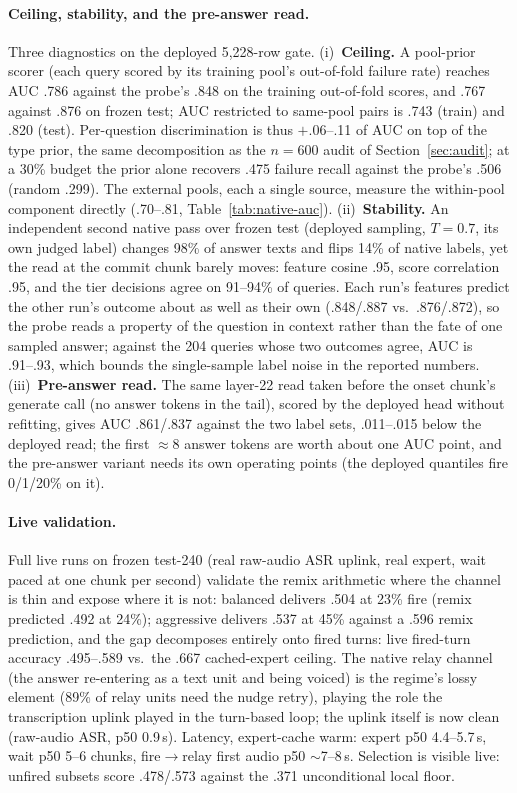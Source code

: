\paragraph{Ceiling, stability, and the pre-answer read.} Three
diagnostics on the deployed 5{,}228-row gate. (i)~\textbf{Ceiling.} A
pool-prior scorer (each query scored by its training pool's
out-of-fold failure rate) reaches AUC .786 against the probe's .848 on
the training out-of-fold scores, and .767 against .876 on frozen
test; AUC restricted to same-pool pairs is .743 (train) and .820
(test). Per-question discrimination is thus $+$.06--.11 of AUC on
top of the type prior, the same decomposition as the $n{=}600$ audit
of Section~\ref{sec:audit}; at a 30\% budget the prior alone recovers
.475 failure recall against the probe's .506 (random .299). The
external pools, each a single source, measure the within-pool
component directly (.70--.81, Table~\ref{tab:native-auc}).
(ii)~\textbf{Stability.} An independent second native pass over frozen
test (deployed sampling, $T{=}0.7$, its own judged label) changes 98\%
of answer texts and flips 14\% of native labels, yet the read at the
commit chunk barely moves: feature cosine .95, score correlation .95,
and the tier decisions agree on 91--94\% of queries. Each run's
features predict the other run's outcome about as well as
their own (.848/.887 vs.\ .876/.872), so the probe reads a property
of the question in context rather than the fate of one sampled
answer; against the 204 queries whose two outcomes agree, AUC is
.91--.93, which bounds the single-sample label noise in the reported
numbers. (iii)~\textbf{Pre-answer read.} The same layer-22 read taken
before the onset chunk's generate call (no answer tokens in the tail),
scored by the deployed head without refitting, gives AUC .861/.837
against the two label sets, .011--.015 below the deployed read; the
first $\approx$8 answer tokens are worth about one AUC point, and the
pre-answer variant needs its own operating points (the deployed
quantiles fire 0/1/20\% on it).

\paragraph{Live validation.} Full live runs on frozen test-240 (real
raw-audio ASR uplink, real expert, wait paced at one chunk per second)
validate the remix arithmetic where the channel is thin and expose
where it is not: balanced delivers .504 at 23\% fire (remix predicted
.492 at 24\%); aggressive delivers .537 at 45\% against a .596 remix
prediction, and the gap decomposes entirely onto fired turns:
live fired-turn accuracy .495--.589 vs.\ the .667 cached-expert
ceiling. The native relay channel (the answer re-entering as a
text unit and being voiced) is the regime's lossy element (89\% of
relay units need the nudge retry), playing the role the
transcription uplink played in the turn-based loop; the uplink itself
is now clean (raw-audio ASR, p50 0.9\,s). Latency, expert-cache warm:
expert p50 4.4--5.7\,s, wait p50 5--6 chunks, fire$\to$relay first
audio p50 $\sim$7--8\,s. Selection is visible live: unfired subsets
score .478/.573 against the .371 unconditional local floor.

